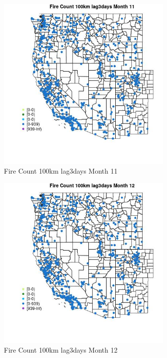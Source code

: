 \begin{figure} 
\centering  
\includegraphics[width=0.77\textwidth]{Code_Outputs/Report_ML_input_PM25_Step4_part_e_de_duplicated_aves_compiled_2019-05-21wNAs_MapObsMo11Fire_Count_100km_lag3days.jpg} 
\caption{\label{fig:Report_ML_input_PM25_Step4_part_e_de_duplicated_aves_compiled_2019-05-21wNAsMapObsMo11Fire_Count_100km_lag3days}Fire Count 100km lag3days Month 11} 
\end{figure} 
 

\begin{figure} 
\centering  
\includegraphics[width=0.77\textwidth]{Code_Outputs/Report_ML_input_PM25_Step4_part_e_de_duplicated_aves_compiled_2019-05-21wNAs_MapObsMo12Fire_Count_100km_lag3days.jpg} 
\caption{\label{fig:Report_ML_input_PM25_Step4_part_e_de_duplicated_aves_compiled_2019-05-21wNAsMapObsMo12Fire_Count_100km_lag3days}Fire Count 100km lag3days Month 12} 
\end{figure} 
 

